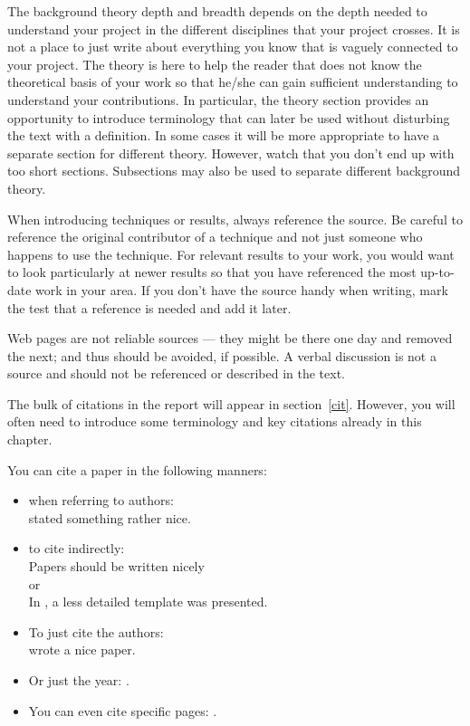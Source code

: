 
\begin{tcolorbox}[width=\linewidth, sharp corners=all, colback=white!96!black]

    The background theory depth and breadth depends on the depth needed to understand your project in the different disciplines that your project crosses.  It is not a place to just write about everything you know that is vaguely connected to your project. The theory is here to help the reader that does not know the theoretical basis of your work so that he/she can gain sufficient understanding to understand your contributions. In particular, the theory section provides an opportunity to introduce terminology that can later be used without disturbing the text with a definition.  In some cases it will be more appropriate to have a separate section for different theory. However, watch that you don't end up with too short sections. Subsections may also be used to separate different background theory.

    When introducing techniques or results, always reference the source. Be careful to reference the original contributor of a technique and not just someone who happens to use the technique. For relevant results to your work, you would want to look particularly at newer results so that you have referenced the most up-to-date work in your area. If you don't have the source handy when writing, mark the test that a reference is needed and add it later.

    Web pages are not reliable sources --- they might be there one day and removed the next; and thus should be avoided, if possible. A verbal discussion is not a source and should not be referenced or described in the text.

    The bulk of citations in the report will appear in section~\ref{cit}. However, you will often need to introduce some terminology and key citations already in this chapter.

    You can cite a paper in the following manners:

    \begin{itemize}
        \item when referring to authors:\\
              \citet{Bandara2019} stated something rather nice.
        \item to cite indirectly: \\
              Papers should be written nicely \citep{Bandara2019}\\
              or\\
              In \cite{Bandara2019}, a less detailed template was presented.
        \item To just cite the authors: \\
              \citeauthor{Bandara2019} wrote a nice paper.
        \item Or just the year: \citeyear{Bandara2019}.
        \item You can even cite specific pages: \citet[p. 3]{Bandara2019}.
    \end{itemize}
\end{tcolorbox}

